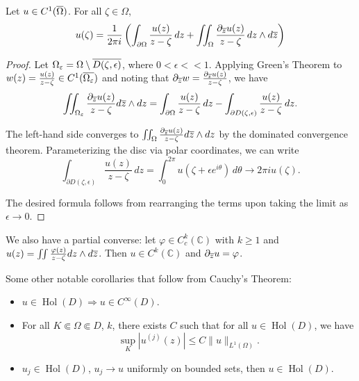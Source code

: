 \documentclass[11pt]{scrartcl}
\newcommand{\C}{\mathbb C}
\newcommand{\Hol}{\operatorname{Hol}}
\let \phi \varphi
\let \p \partial
\let \eps \varepsilon
\newcommand{\1}{\textbf{1}} %
\begin{document}
\begin{theorem} Let $u \in C^1(\overline{\Omega})$.  For all $\zeta \in \Omega$, 
$$u(\zeta) = \frac{1}{2\pi i} \left (\int_{\partial \Omega} \frac{u(z)}{z - \zeta}\,dz + \iint_{\Omega} \frac{\partial_{\overline{z}} u(z)}{z - \zeta}\, dz \wedge d\overline{z} \right)$$
\end{theorem}
\begin{proof}
Let $\Omega_{\eps} = \Omega \setminus \ol{D(\zeta, \epsilon)}$, where $0 < \epsilon << 1$.  Applying Green's Theorem to $w(z) = \frac{u(z)}{z - \zeta} \in C^1(\ol{\Omega_\eps})$ and noting that $\p_{\ol{z}} w = \frac{\p_{\ol{z}} u(z)}{z - \zeta}$, we have 
$$\iint_{\Omega_{\eps}} \frac{\p_{\ol{z}} u(z)}{z - \zeta} d\ol{z} \wedge dz = \int_{\p \Omega} \frac{u(z)}{z - \zeta} \,dz - \int_{\p D(\zeta, \epsilon)} \frac{u(z)}{z - \zeta} \,dz.$$

The left-hand side converges to $\iint_\Omega \frac{\partial_{\overline{z}} u(z)}{z - \zeta} d\overline{z} \wedge dz$ by the dominated convergence theorem.  Parameterizing the disc via polar coordinates, we can write 
$$\int_{\p D(\zeta, \epsilon)} \frac{u(z)}{z - \zeta} \,dz = \int_0^{2\pi} u(\zeta + \epsilon e^{i\theta})\,d\theta \to 2\pi i u(\zeta).$$

The desired formula follows from rearranging the terms upon taking the limit as $\epsilon \to 0$.
\end{proof}
\begin{remark} We also have a partial converse: let $\phi \in C_c^k(\C)$ with $k \ge 1$ and $u(z) = \iint \frac{\phi(z)}{z - \zeta} dz \wedge d\ol{z}$.  Then $u \in C^k(\C)$ and $\p_{\ol{z}} u = \phi$.
\end{remark}
Some other notable corollaries that follow from Cauchy's Theorem:
\begin{itemize}
\item $u \in \Hol(D) \Rightarrow u \in C^\infty(D)$.
\item For all $K \Subset \Omega \Subset D$, $k$, there exists $C$ such that for all $u \in \Hol(D)$, we have 
$$\sup_{K} |u^{(j)}(z)| \le C \|u \|_{L^1(\Omega)}.$$
\item $u_j \in \Hol(D)$, $u_j \to u$ uniformly on bounded sets, then $u \in \Hol(D)$.
\end{itemize}
\pagebreak
\end{document}

